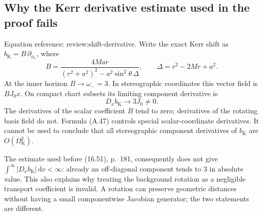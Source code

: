 \documentclass[10pt]{article}
\begin{document}
\subsection*{Why the Kerr derivative estimate used in the proof fails}
Equation reference: review:shift-derivative. Write the exact Kerr shift as \(b_{\mathrm K}=B\,\partial_{\phi_*}\), where \[B=\frac{4Mar}{(r^2+a^2)^2-a^2\sin^2\theta\,\Delta},
 \qquad \Delta=r^2-2Mr+a^2.\] At the inner horizon \(B\to\omega_-=3\). In stereographic coordinates this vector field is \(B J_0x\). On compact chart subsets its limiting component derivative is \[
 D_x b_{\mathrm K}\longrightarrow 3J_0\ne0.\] The derivatives of the scalar coefficient \(B\) tend to zero; derivatives of the rotating basis field do not. Formula (A.47) controls special scalar-coordinate derivatives. It cannot be used to conclude that all stereographic component derivatives of \(b_{\mathrm K}\) are \(O(\Omega_{\mathrm K}^2)\).\par
The estimate used before (16.51), p. 181, consequently does not give \(\int^\infty |D_xb_{\mathrm K}|\,\mathrm dv<\infty\): already an off-diagonal component tends to \(3\) in absolute value. This also explains why treating the background rotation as a negligible transport coefficient is invalid. A rotation can preserve geometric distances without having a small componentwise Jacobian generator; the two statements are different.\par
\end{document}
